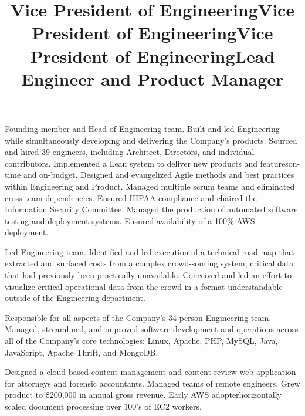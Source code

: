 \documentclass[margin]{res}
\begin{document}
\begin{resume}
\title{\textbf{Vice President of Engineering}}
\begin{position}
\hspace*{.5cm}Founding member and Head of Engineering team.  Built and led Engineering while simultaneously developing and delivering the Company's products. Sourced and hired 39 engineers, including Architect, Directors, and individual contributors.  Implemented a Lean system to deliver new products and features\textemdash on-time and on-budget. Designed and evangelized Agile methods and best practices within Engineering and Product. Managed multiple scrum teams and eliminated cross-team dependencies.  Ensured HIPAA compliance and chaired the Information Security Committee.  Managed the production of automated software testing and deployment systems.  Ensured availability of a 100\% AWS deployment.
\end{position}

\title{\textbf{Vice President of Engineering}}
\begin{position}
\hspace*{.5cm}Led Engineering team. Identified and led execution of a technical road-map that extracted and surfaced costs from a complex crowd-souring system; critical data that had previously been practically unavailable. Conceived and led an effort to visualize critical operational data from the crowd in a format understandable outside of the Engineering department.
\end{position}

\title{\textbf{Vice President of Engineering}}
\begin{position}
\hspace*{.5cm}Responsible for all aspects of the Company's 34-person Engineering team. Managed, streamlined, and improved software development and operations across all of the Company's core technologies: Linux, Apache, PHP, MySQL, Java, JavaScript, Apache Thrift, and MongoDB.
\end{position}

\title{\textbf{Lead Engineer and Product Manager}}
\begin{position}
\hspace*{.5cm}Designed a cloud-based content management and content review web application for attorneys and forensic accountants.  Managed teams of remote engineers. Grew product to \$200,000 in annual gross revenue. Early AWS adopter\textemdash horizontally scaled document processing over 100's of EC2 workers.
\end{position}


\end{resume}
\end{document}
